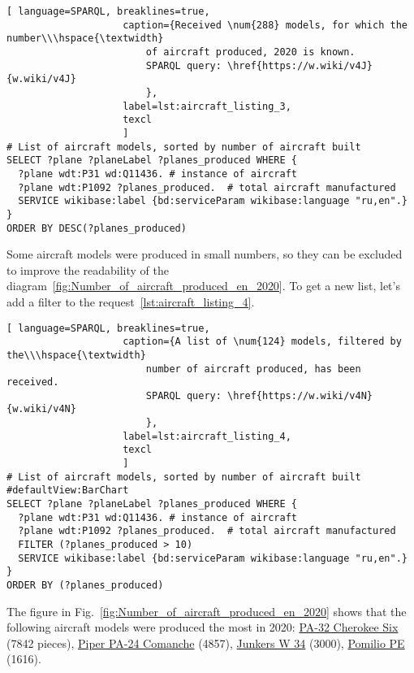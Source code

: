 \begin{lstlisting}[ language=SPARQL, breaklines=true, 
                    caption={Received \num{288} models, for which the number\\\hspace{\textwidth}
                        of aircraft produced, 2020 is known. 
                        SPARQL query: \href{https://w.wiki/v4J}{w.wiki/v4J}
                        },
                    label=lst:aircraft_listing_3,
                    texcl 
                    ]
# List of aircraft models, sorted by number of aircraft built
SELECT ?plane ?planeLabel ?planes_produced WHERE {
  ?plane wdt:P31 wd:Q11436. # instance of aircraft
  ?plane wdt:P1092 ?planes_produced.  # total aircraft manufactured
  SERVICE wikibase:label {bd:serviceParam wikibase:language "ru,en".}
}
ORDER BY DESC(?planes_produced)
\end{lstlisting}

Some aircraft models were produced in small numbers, so they can be excluded to improve the readability of the diagram~\ref{fig:Number_of_aircraft_produced_en_2020}. 
To get a new list, let's add a filter to the request~\ref{lst:aircraft_listing_4}.

\begin{lstlisting}[ language=SPARQL, breaklines=true, 
                    caption={A list of \num{124} models, filtered by the\\\hspace{\textwidth}
                        number of aircraft produced, has been received.
                        SPARQL query: \href{https://w.wiki/v4N}{w.wiki/v4N}
                        },
                    label=lst:aircraft_listing_4,
                    texcl 
                    ]
# List of aircraft models, sorted by number of aircraft built
#defaultView:BarChart
SELECT ?plane ?planeLabel ?planes_produced WHERE {
  ?plane wdt:P31 wd:Q11436. # instance of aircraft
  ?plane wdt:P1092 ?planes_produced.  # total aircraft manufactured
  FILTER (?planes_produced > 10)
  SERVICE wikibase:label {bd:serviceParam wikibase:language "ru,en".}
}
ORDER BY (?planes_produced)
\end{lstlisting}

The figure in Fig.~\ref{fig:Number_of_aircraft_produced_en_2020} shows that the following aircraft models were produced the most in 
2020: \href{https://www.wikidata.org/wiki/Q2096452}{PA-32 Cherokee Six} (\num{7842} pieces), \href{https://www.wikidata.org/wiki/Q1860367}{Piper PA-24 Comanche} 
(\num{4857}), \href{https://www.wikidata.org/wiki/Q694521}{Junkers W 34} (\num{3000}), \href{https://www.wikidata.org/wiki/Q941011}{Pomilio PE} 
(\num{1616}).

